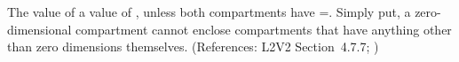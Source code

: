 The   value of a   value of
, unless both compartments have =.
Simply put, a zero-dimensional compartment cannot enclose compartments that
have anything other than zero dimensions themselves.  (References: L2V2
Section~4.7.7; )
